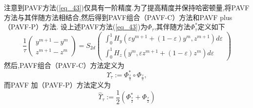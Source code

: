 注意到PAVF方法(\ref{eq_43})仅具有一阶精度\cite{caiPartitionedAveragedVector2018}.为了提高精度并保持哈密顿量,将PAVF方法与其伴随方法相结合,然后得到PAVF组合（PAVF-C）方法和PAVF plus（PAVF-P）方法.
设上述PAVF方法(\ref{eq_43})为$\Phi_{\tau}$,其伴随方法$\Phi_{\tau}^{*}$定义如下
\begin{equation}
\frac{1}{\tau}\left(\begin{array}{c}
y^{m+1}-y^{m} \\
z^{m+1}-z^{m}
\end{array}\right)=S_{2 d}\left(\begin{array}{c}
\int_{0}^{1} H_{y}\left(\varepsilon y^{m+1}+(1-\varepsilon) y^{m}, z^{m+1}\right) d \varepsilon \\
\int_{0}^{1} H_{z}\left(y^{m}, \varepsilon z^{m+1}+(1-\varepsilon) z^{m}\right) d \varepsilon
\end{array}\right)
\label{eq_44}\end{equation}
然后,PAVF组合（PAVF-C）方法定义为
\begin{equation}
\Upsilon_{\tau}:=\Phi_{\frac{\tau}{2}}^{*} \circ \Phi_{\frac{\tau}{2}},
\label{eq_45}\end{equation}
而PAVF 加（PAVF-P）方法定义为
\begin{equation}
\hat{\Upsilon}_{\tau}:=\frac{1}{2}\left(\Phi_{\frac{\tau}{2}}^{*}+\Phi_{\frac{\tau}{2}}\right)
\label{eq_46}\end{equation}




